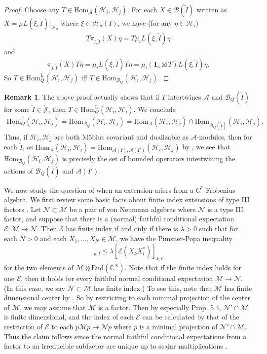 \documentclass[11pt,b5paper,notitlepage]{article}
\theoremstyle{definition}
\newtheorem{rem}[df]{Remark}
\theoremstyle{plain}
\newcommand{\mc}{\mathcal}
\newcommand{\wtd}{\widetilde}
\newcommand{\End}{\mathrm{End}} %
\newcommand{\id}{\mathbf{1}}
\newcommand{\Hom}{\mathrm{Hom}}
\newcommand{\Jtd}{\widetilde{\mathcal J}}
\newcommand{\HomL}{\mathrm{Hom}^{\mathrm{L}}}
\newcommand{\Cbb}{\mathbb C}
\numberwithin{equation}{section}
\begin{document}
\begin{proof}
Choose any $T\in\Hom_{\mc A}(\mc H_i,\mc H_j)$. For each $X\in\mc B(\wtd I)$ written as $X=\mu L(\xi,\wtd I)|_{\mc H_a}$ where $\xi\in\mc H_a(I)$, we have (for any $\eta\in\mc H_i$)
\begin{align*}
T\pi_{i,\wtd I}(X)\eta=T\mu_i L(\xi,\wtd I)\eta	
\end{align*}
and
\begin{align*}
\pi_{j,\wtd I}(X)T\eta=\mu_i L(\xi,\wtd I)T\eta=\mu_i(\id_a\boxtimes T)L(\xi,\wtd I)\eta.
\end{align*}
So $T\in\HomL_Q(\mc H_i,\mc H_j)$ iff $T\in\Hom_{\mc B_Q}(\mc H_i,\mc H_j)$.
\end{proof}


\begin{rem}
The above proof actually shows that if $T$ intertwines $\mc A$ and $\mc B_Q(\wtd I)$ for some $\wtd I\in\Jtd$, then $T\in\HomL_Q(\mc H_i,\mc H_j)$. We conclude
\begin{align}
\HomL_Q(\mc H_i,\mc H_j)=\Hom_{\mc B_Q}(\mc H_i,\mc H_j)=\Hom_{\mc A}(\mc H_i,\mc H_j)\cap \Hom_{\mc B_Q(\wtd I)}(\mc H_i,\mc H_j).
\end{align}
Thus, if $\mc H_i,\mc H_j$ are both M\"obius covariant and dualizable as $\mc A$-modules, then for each $\wtd I$, as $\Hom_{\mc A}(\mc H_i,\mc H_j)=\Hom_{\mc A(I),\mc A(I')}(\mc H_i,\mc H_j)$ by \cite[Thm. 2.3]{GL96}, we see that $\Hom_{\mc B_Q}(\mc H_i,\mc H_j)$ is precisely the set of bounded operators intertwining the actions of $\mc B_Q(\wtd I)$ and $\mc A(I')$.
\end{rem}


We now study the question of when an extension arises from a $C^*$-Frobenius algebra. We first review some basic facts about finite index extensions of type III factors \cite{Lon89,Lon90,Kos98,BDH14}. Let $\mc N\subset\mc M$ be a pair of von Neumann algebras where $\mc N$ is a type III factor, and suppose that there is a (normal) faithful conditional expectation $\mc E:\mc M\rightarrow\mc N$. Then  $\mc E$ has finite index if and only if  there is $\lambda>0$ such that  for each $N>0$ and each $X_1,\dots,X_N\in\mc M$, we have the Pimsner-Popa inequality
\begin{align}
[X_k X_l^*]_{k,l}\leq \lambda [\mc E(X_k X_l^*)]_{k,l}	\label{eq13}
\end{align}
for the two elements of $\mc M\otimes\End(\Cbb^N)$. Note that if the finite index holds for one $\mc E$, then it holds for every faithful normal conditional expectation $\mc M\rightarrow\mc N$. (In this case, we say $\mc N\subset\mc M$ has finite index.) To see this, note that $\mc M$ has finite dimensional center by  \cite[Prop. 7.20]{BDH14}. So by restricting to each minimal projection of the center of $\mc M$, we may assume that $\mc M$ is a factor. Then by \cite{Lon89} especially Prop. 5.4, $\mc N'\cap \mc M$ is finite dimensional, and the index of each $\mc E$ can be calculated by that of the restriction of $\mc E$ to each $p\mc M p\rightarrow\mc N p$ where $p$ is a minimal projection of $\mc N'\cap \mc M$. Thus the claim follows since the normal faithful conditional expectations from a factor to an irreducible subfactor are unique up to scalar multiplications \cite{Kos98}.
\end{document}

